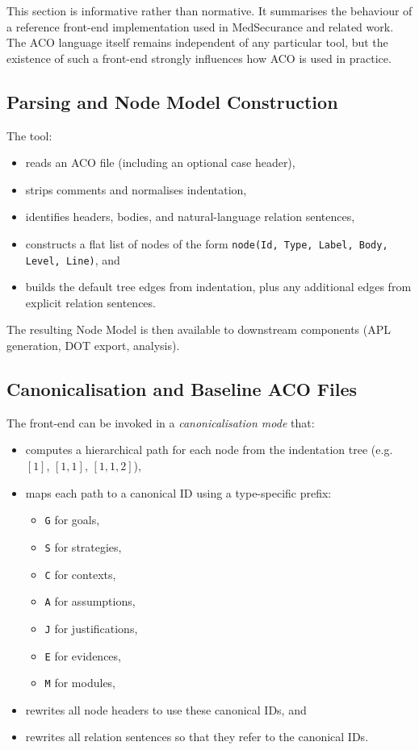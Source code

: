 \documentclass[11pt]{article}
\begin{document}
\begingroup
\color{blue}
This section is informative rather than normative. It summarises the behaviour of a reference front-end implementation used in MedSecurance and related work. The ACO language itself remains independent of any particular tool, but the existence of such a front-end strongly influences how ACO is used in practice.

\subsection*{Parsing and Node Model Construction}

The tool:
\begin{itemize}[leftmargin=2em]
  \item reads an ACO file (including an optional case header),
  \item strips comments and normalises indentation,
  \item identifies headers, bodies, and natural-language relation sentences,
  \item constructs a flat list of nodes of the form
    \texttt{node(Id, Type, Label, Body, Level, Line)}, and
  \item builds the default tree edges from indentation, plus any additional edges from explicit relation sentences.
\end{itemize}

The resulting Node Model is then available to downstream components (APL generation, DOT export, analysis).

\subsection*{Canonicalisation and Baseline ACO Files}

The front-end can be invoked in a \emph{canonicalisation mode} that:
\begin{itemize}[leftmargin=2em]
  \item computes a hierarchical path for each node from the indentation tree (e.g.\ \([1]\), \([1,1]\), \([1,1,2]\)),
  \item maps each path to a canonical ID using a type-specific prefix:
    \begin{itemize}[leftmargin=1.5em]
      \item \texttt{G} for goals,
      \item \texttt{S} for strategies,
      \item \texttt{C} for contexts,
      \item \texttt{A} for assumptions,
      \item \texttt{J} for justifications,
      \item \texttt{E} for evidences,
      \item \texttt{M} for modules,
    \end{itemize}
  \item rewrites all node headers to use these canonical IDs, and
  \item rewrites all relation sentences so that they refer to the canonical IDs.
\end{itemize}
\end{document}
